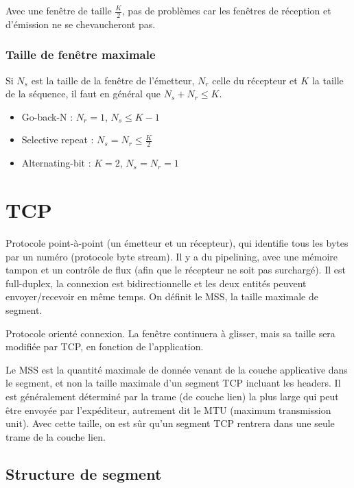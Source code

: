 			Avec une fenêtre de taille $\frac{K}{2}$, pas de problèmes car les fenêtres de réception et d'émission ne se chevaucheront pas.

			\subsubsection{Taille de fenêtre maximale}
			
			Si $N_s$ est la taille de la fenêtre de l'émetteur, $N_r$ celle du récepteur et $K$ la taille de la séquence, il faut en général que $N_s + N_r \leq K$.
			
			\begin{itemize}
				\item Go-back-N : $N_r = 1$, $N_s \leq K - 1$
				\item Selective repeat : $N_s = N_r \leq \frac{K}{2}$
				\item Alternating-bit : $K = 2$, $N_s = N_r = 1$
			\end{itemize}
		

\section{TCP}
			
	Protocole point-à-point (un émetteur et un récepteur), qui identifie tous les bytes par un numéro (protocole byte stream). Il y a du pipelining, avec une mémoire tampon et un contrôle de flux (afin que le récepteur ne soit pas surchargé). Il est full-duplex, la connexion est bidirectionnelle et les deux entités peuvent envoyer/recevoir en même temps. On définit le MSS, la taille maximale de segment.
	
	 Protocole orienté connexion. La fenêtre continuera à glisser, mais sa taille sera modifiée par TCP, en fonction de l'application.
	 
	  Le MSS est la quantité maximale de donnée venant de la couche applicative dans le segment, et non la taille maximale d'un segment TCP incluant les headers. Il est généralement déterminé par la trame (de couche lien) la plus large qui peut être envoyée par l'expéditeur, autrement dit le MTU (maximum transmission unit). Avec cette taille, on est sûr qu'un segment TCP rentrera dans une seule trame de la couche lien.
	 
	\subsection{Structure de segment}


